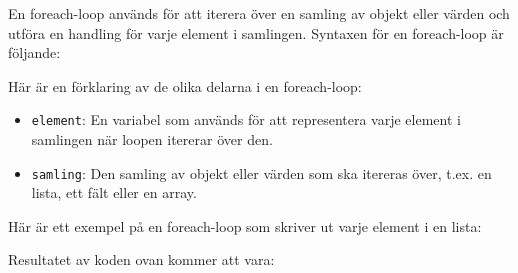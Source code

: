 En foreach-loop används för att iterera över en samling av objekt eller
värden och utföra en handling för varje element i samlingen. Syntaxen
för en foreach-loop är följande:

\hypertarget{cb1}{}
\begin{Shaded}
\begin{Highlighting}[]
 \OperatorTok{(}\OperatorTok{:}\OperatorTok{)} \OperatorTok{\{}
\OperatorTok{\}}
\end{Highlighting}
\end{Shaded}

Här är en förklaring av de olika delarna i en foreach-loop:

\begin{itemize}
\tightlist
\item
  \texttt{element}: En variabel som används för att representera varje
  element i samlingen när loopen itererar över den.
\item
  \texttt{samling}: Den samling av objekt eller värden som ska itereras
  över, t.ex. en lista, ett fält eller en array.
\end{itemize}

Här är ett exempel på en foreach-loop som skriver ut varje element i en
lista:

\hypertarget{cb2}{}
\begin{Shaded}
\begin{Highlighting}[]
\OperatorTok{\textless{}}\OperatorTok{\textgreater{}}\OperatorTok{=}  \OperatorTok{\textless{}\textgreater{}(}\OperatorTok{(}\OperatorTok{,} \OperatorTok{,} \OperatorTok{,} \OperatorTok{,} \OperatorTok{));}

 \OperatorTok{(}\OperatorTok{:}\OperatorTok{)} \OperatorTok{\{}
    \OperatorTok{(}\OperatorTok{);}
\OperatorTok{\}}
\end{Highlighting}
\end{Shaded}

Resultatet av koden ovan kommer att vara:

\begin{Shaded}
\begin{Highlighting}[]
\end{Highlighting}
\end{Shaded}

